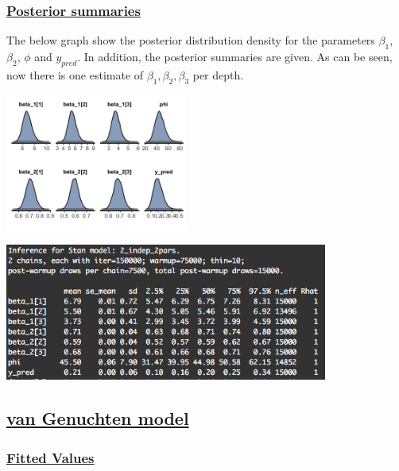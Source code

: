 \documentclass{article}
\begin{document}
\subsubsection*{\underline{Posterior summaries}}
The below graph show the posterior distribution density for the parameters $\beta_1$, $\beta_2$, $\phi$ and $y_{pred}$. In addition, the posterior summaries are given. As can be seen, now there is one estimate of $\beta_1,\beta_2,\beta_3$ per depth.
\begin{minipage}{0.50\textwidth}
\includegraphics[width=\linewidth, height = 4.5cm]{indep_2pars_dens.png}
\end{minipage}
\begin{minipage}{0.50\textwidth}
\includegraphics[width=\linewidth, height = 4.5cm]{p03.png}
\end{minipage}


\newpage


\subsection*{\underline{van Genuchten model}}
\subsubsection*{\underline{Fitted Values}}
\end{document}
